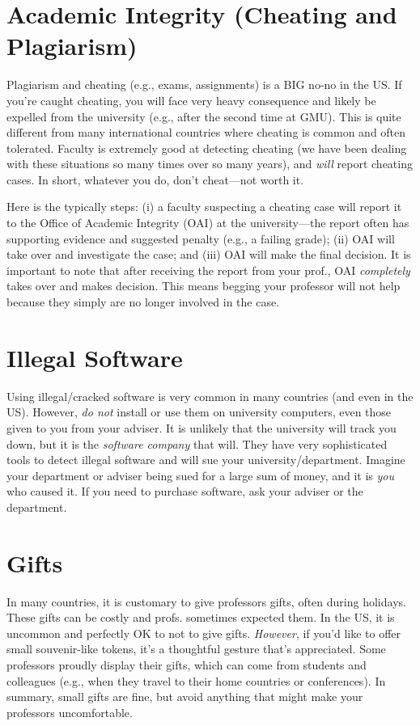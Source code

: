 \documentclass[oneside,11pt]{memoir}
\begin{document}
\section{Academic Integrity (Cheating and Plagiarism)} 

Plagiarism and cheating (e.g., exams, assignments) is a BIG no-no in the US.  If you're caught cheating, you will face very heavy consequence and likely be expelled from the university (e.g., after the second time at GMU).   This is quite different from many international countries where cheating is common and often tolerated.  Faculty is extremely good at detecting cheating (we have been dealing with these situations so many times over so many years), and \emph{will} report cheating cases.  In short, whatever you do, don't cheat---not worth it.

Here is the typically steps: (i) a faculty suspecting a cheating case will report it to the Office of Academic Integrity (OAI) at the university---the report often has supporting evidence and suggested penalty (e.g., a failing grade);  (ii)  OAI will take over and investigate the case; and (iii) OAI will make the final decision.  It is important to note that after receiving the report from your prof., OAI \emph{completely} takes over and makes decision.  This means begging your professor will not help because they simply are no longer involved in the case.

\section{Illegal Software} Using illegal/cracked software is very common in many countries (and even in the US). However, \emph{do not} install or use them on university computers, even those given to you from your adviser.  It is unlikely that the university will track you down, but it is the \emph{software company} that will.  They have very sophisticated tools to detect illegal software and will sue your university/department.  Imagine your department or adviser being sued for a large sum of money, and it is \emph{you} who caused it.  If you need to purchase software,  ask your adviser or the department.


\section{Gifts}\label{sec:gifts} In many countries, it is customary to give professors gifts, often during holidays.  These gifts can be costly and profs. sometimes expected them. In the US, it is uncommon and perfectly OK to not to give gifts. \emph{However}, if you'd like to offer small souvenir-like tokens, it's a thoughtful gesture that's appreciated. Some professors proudly display their gifts, which can come from students and colleagues (e.g., when they travel to their home countries or conferences). In summary, small gifts are fine, but avoid anything that might make your professors uncomfortable.
\end{document}
